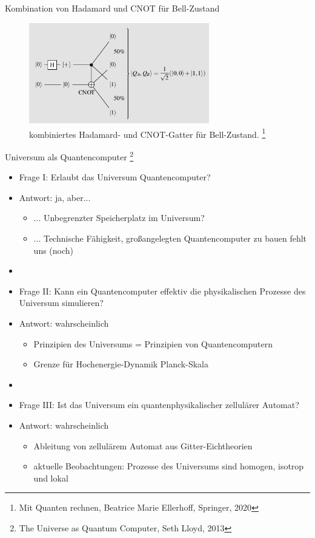 \documentclass[aspectratio=1610, 9pt]{beamer}
\begin{document}
\begin{frame}{Kombination von Hadamard und CNOT für Bell-Zustand}
  \begin{figure}
      \includegraphics[width=0.7\textwidth]{images/kombi.png}
      \caption{kombiniertes Hadamard- und CNOT-Gatter für Bell-Zustand. \footnote[14]{Mit Quanten rechnen, Beatrice Marie Ellerhoff, Springer, 2020}}
  \end{figure}
\end{frame}

\begin{frame}{Universum als Quantencomputer \footnote[8]{The Universe as Quantum Computer, Seth Lloyd, 2013}}
  \begin{itemize}
    \item Frage I: Erlaubt das Universum Quantencomputer?
    \item Antwort: ja, aber...
    \begin{itemize}
      \item[] ... Unbegrenzter Speicherplatz im Universum?
      \item[] ... Technische Fähigkeit, großangelegten Quantencomputer zu bauen fehlt uns (noch)
    \end{itemize}
    \item[]
    \item Frage II: Kann ein Quantencomputer effektiv die physikalischen Prozesse des Universum simulieren?
    \item Antwort: wahrscheinlich
    \begin{itemize}
      \item[] Prinzipien des Universums = Prinzipien von Quantencomputern
      \item[] Grenze für Hochenergie-Dynamik \rightarrow Planck-Skala
    \end{itemize}
    \item[]
    \item Frage III: Ist das Universum ein quantenphysikalischer zellulärer Automat?
    \item Antwort: wahrscheinlich
    \begin{itemize}
      \item[] Ableitung von zellulärem Automat aus Gitter-Eichtheorien
      \item[] aktuelle Beobachtungen: Prozesse des Universums sind homogen, isotrop und lokal
    \end{itemize}
  \end{itemize}

\end{frame}
\end{document}
